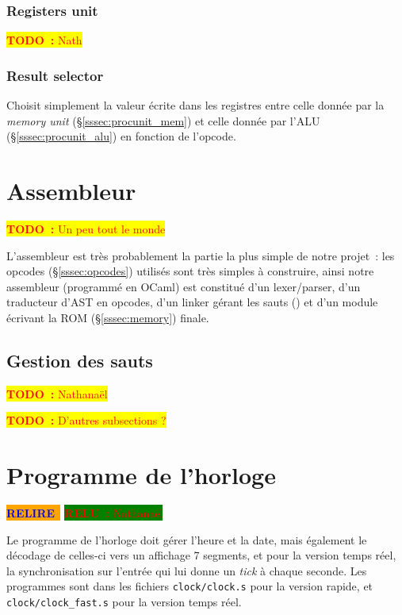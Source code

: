 \documentclass[11pt,a4paper]{article}
\newcommand{\htodo}[1]{\begin{huge}\colorbox{yellow}{\textcolor{red}{\textbf{TODO~:} #1}}\end{huge}}
\newcommand{\todo}[1]{\colorbox{yellow}{\textcolor{red}{\textbf{TODO~:} #1}}}
\newcommand{\relire}{\colorbox{orange}{\textcolor{blue}{\textbf{RELIRE}~}}}
\newcommand{\relu}[1]{\colorbox{green}{\textcolor{red}{\textbf{RELU~:} #1}}}
\begin{document}
\subsubsection{Registers unit}
\todo{Nath}

\subsubsection{Result selector}
Choisit simplement la valeur écrite dans les registres entre celle donnée par la \textit{memory unit} (§\ref{sssec:procunit_mem}) et celle donnée par l'ALU (§\ref{sssec:procunit_alu}) en fonction de l'opcode.

\section{Assembleur} \label{sec:cas}

\htodo{Un peu tout le monde}

L'assembleur est très probablement la partie la plus simple de notre projet~: les opcodes (§\ref{sssec:opcodes}) utilisés sont très simples à construire, ainsi notre assembleur (programmé en OCaml) est constitué d'un lexer/parser, d'un traducteur d'AST en opcodes, d'un \og linker \fg{} gérant les sauts () et d'un module écrivant la ROM (§\ref{sssec:memory}) finale.

\subsection{Gestion des sauts}
\todo{Nathanaël}

\vspace{1em}\htodo{D'autres subsections ?}


\section{Programme de l'horloge} \label{sec:clock}

\relire
\relu{Nathanaël}

Le programme de l'horloge doit gérer l'heure et la date, mais
également le décodage de celles-ci vers un affichage 7 segments, et
pour la version temps réel, la synchronisation sur l'entrée qui lui
donne un \textit{tick} à chaque seconde. Les programmes sont dans les
fichiers \verb!clock/clock.s! pour la version rapide, et
\verb!clock/clock_fast.s! pour la version temps réel.
\end{document}
